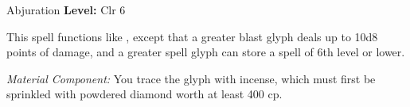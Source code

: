 {Abjuration}
{
	\textbf{Level:}
	Clr 6\\
}
{
	This spell functions like , except that a greater blast glyph deals up to 10d8 points of damage, and a greater spell glyph can store a spell of 6th level or lower.

	\textit{Material Component:}
	You trace the glyph with incense, which must first be sprinkled with powdered diamond worth at least 400 cp.

}
